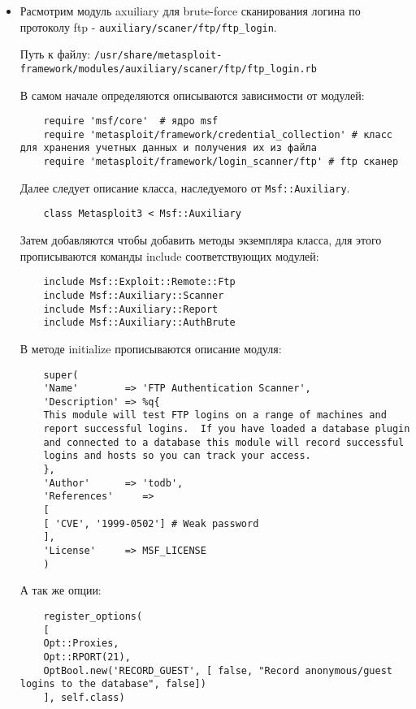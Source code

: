 \documentclass{article}
\begin{document}
 \begin{itemize}
 	
 	\item Расмотрим модуль axuiliary для brute-force сканирования логина по протоколу ftp - \verb'auxiliary/scaner/ftp/ftp_login'.
 	
 	Путь к файлу: \verb'/usr/share/metasploit-framework/modules/auxiliary/scaner/ftp/ftp_login.rb'
 	
 	В самом начале определяются описываются зависимости от модулей:
 	
 	\begin{verbatim}
 	require 'msf/core'	# ядро msf
 	require 'metasploit/framework/credential_collection' # класс для хранения учетных данных и получения их из файла
 	require 'metasploit/framework/login_scanner/ftp' # ftp сканер
 	\end{verbatim}
 	
 	Далее следует описание класса, наследуемого от \verb'Msf::Auxiliary'.
 	
 	\begin{verbatim}
 	class Metasploit3 < Msf::Auxiliary
 	\end{verbatim}
 	
 	Затем добавляются чтобы добавить методы экземпляра класса, для этого прописываются команды include соответствующих модулей:
 	
 	\begin{verbatim}
 	include Msf::Exploit::Remote::Ftp
 	include Msf::Auxiliary::Scanner
 	include Msf::Auxiliary::Report
 	include Msf::Auxiliary::AuthBrute
 	\end{verbatim}
 	
 	В методе initialize прописываются описание модуля: 
 	
 	\begin{verbatim}
 	super(
 	'Name'        => 'FTP Authentication Scanner',
 	'Description' => %q{
 	This module will test FTP logins on a range of machines and
 	report successful logins.  If you have loaded a database plugin
 	and connected to a database this module will record successful
 	logins and hosts so you can track your access.
 	},
 	'Author'      => 'todb',
 	'References'     =>
 	[
 	[ 'CVE', '1999-0502'] # Weak password
 	],
 	'License'     => MSF_LICENSE
 	)
 	\end{verbatim}
 	
 	А так же опции: 
 	
 	\begin{verbatim}
 	register_options(
 	[
 	Opt::Proxies,
 	Opt::RPORT(21),
 	OptBool.new('RECORD_GUEST', [ false, "Record anonymous/guest logins to the database", false])
 	], self.class)
 	

\end{verbatim}
\end{itemize}
\end{document}
